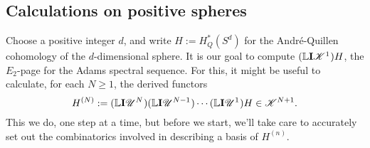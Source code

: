 \documentclass[11pt]{article}
\newcommand{\LL}[1]{{\scrK}^{#1}}%
\newcommand{\nontop}[1]{\scrU^{#1}}%
\newcommand{\Ind}[2][]{\mathbf{I}{#2}_{#1}}%
\newcommand{\derived}{\mathbb{L}}
\begin{document}
\begin{CalculatingRepeatedKoszul}
\section{Calculations on positive spheres}
Choose a positive integer $d$, and write $H:=H^*_Q(S^d)$ for the Andr\'e-Quillen cohomology of the $d$-dimensional sphere. It is our goal to compute $(\derived\Ind{\LL{1}})H$, the $E_2$-page for the Adams spectral sequence. For this, it might be useful to calculate, for each $N\geq1$, the derived functors
\[H^{(N)}:=(\derived\Ind{\nontop{N}})(\derived\Ind{\nontop{N-1}})\cdots (\derived\Ind{\nontop{1}})H\in\LL{N+1}.\]
This we do, one step at a time, but before we start, we'll take care to accurately set out the combinatorics involved in describing a basis of $H^{(n)}$.


\end{CalculatingRepeatedKoszul}
\end{document}
